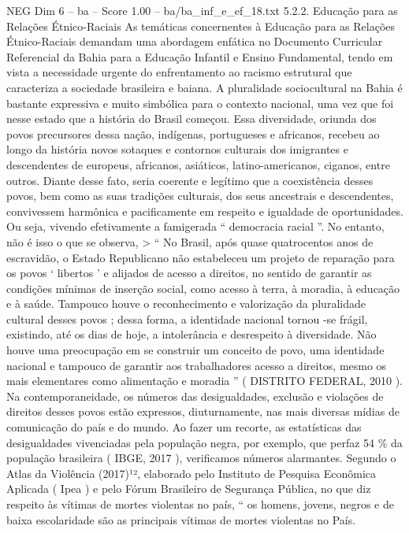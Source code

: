 \begin{textsample}{NEG Dim 6 – ba – Score 1.00 – ba/ba\_inf\_e\_ef\_18.txt}  \label{ex:f6_neg_212}
5.2.2.
Educação para as Relações Étnico-Raciais As temáticas concernentes à Educação para as Relações Étnico-Raciais demandam uma abordagem enfática no Documento Curricular Referencial da Bahia para a Educação Infantil e Ensino Fundamental, tendo em vista a necessidade urgente do enfrentamento ao racismo estrutural que caracteriza a sociedade brasileira e baiana.
A pluralidade sociocultural na Bahia é bastante expressiva e muito simbólica para o contexto nacional, uma vez que foi nesse estado que a história do Brasil começou.
Essa diversidade, oriunda dos povos precursores dessa nação, indígenas, portugueses e africanos, recebeu ao longo da história novos sotaques e contornos culturais dos imigrantes e descendentes de europeus, africanos, asiáticos, latino-americanos, ciganos, entre outros.
Diante desse fato, seria coerente e legítimo que a coexistência desses povos, bem como as suas tradições culturais, dos seus ancestrais e descendentes, convivessem harmônica e pacificamente em respeito e igualdade de oportunidades.
Ou seja, vivendo efetivamente a famigerada “ democracia racial ”.
No entanto, não é isso o que se observa, > “ No Brasil, após quase quatrocentos anos de escravidão, o Estado Republicano não estabeleceu um projeto de reparação para os povos ‘ libertos ’ e alijados de acesso a direitos, no sentido de garantir as condições mínimas de inserção social, como acesso à terra, à moradia, à educação e à saúde.
Tampouco houve o reconhecimento e valorização da pluralidade cultural desses povos ; dessa forma, a identidade nacional tornou -se frágil, existindo, até os dias de hoje, a intolerância e desrespeito à diversidade.
Não houve uma preocupação em se construir um conceito de povo, uma identidade nacional e tampouco de garantir aos trabalhadores acesso a direitos, mesmo os mais elementares como alimentação e moradia ” ( DISTRITO FEDERAL, 2010 ).
Na contemporaneidade, os números das desigualdades, exclusão e violações de direitos desses povos estão expressos, diuturnamente, nas mais diversas mídias de comunicação do país e do mundo.
Ao fazer um recorte, as estatísticas das desigualdades vivenciadas pela população negra, por exemplo, que perfaz 54 \% da população brasileira ( IBGE, 2017 ), verificamos números alarmantes.
Segundo o Atlas da Violência (2017)¹², elaborado pelo Instituto de Pesquisa Econômica Aplicada ( Ipea ) e pelo Fórum Brasileiro de Segurança Pública, no que diz respeito às vítimas de mortes violentas no país, “ os homens, jovens, negros e de baixa escolaridade são as principais vítimas de mortes violentas no País.

\end{textsample}
